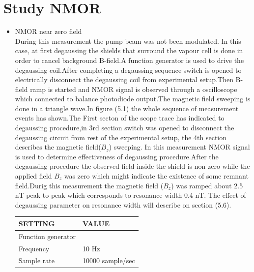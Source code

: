 \documentclass[12pt]{report}
\begin{document}
\section{Study NMOR }
   \begin{itemize}
     \item NMOR near zero field \\
 During this measurement the pump beam was not been modulated. In this case,  at first degaussing the shields that surround the vapour cell is done in order to cancel background B-field.A function generator is used to drive the degaussing coil.After completing a degaussing sequence switch is opened to electrically disconnect the degaussing coil from experimental setup.Then B-field ramp is started and NMOR signal is observed through a oscilloscope which  connected to balance photodiode output.The magnetic field sweeping is done in a triangle wave.In figure (5.1) the whole sequence of measurement events has shown.The First secton of the scope trace has indicated to degaussing procedure,in 3rd section  switch was opened to disconnect the degaussing circuit from rest of the experimental setup, the 4th section describes the magnetic field($B_z$) sweeping. 
In this measurement NMOR signal is used to determine effectiveness of degaussing procedure.After the degaussing procedure the observed field inside the shield is non-zero while the applied field $B_z$ was zero which might indicate the existence of some remnant field.Durig this measurement the magnetic field ($B_z$) was ramped about 2.5 nT peak to peak which corresponds to resonance width 0.4 nT. The effect of degaussing parameter on resonance width will describe on section (5.6).
\begin{table}[h]
\centering
\begin{tabular}{|l |l|}
\hline

\textbf{ SETTING}    & \textbf{VALUE} \\
\hline
Function generator &   \\
\hline
Frequency & 10 Hz   \\

Sample rate    &  10000 sample/sec  \\


\end{tabular}
\end{table}
\end{itemize}
\end{document}
